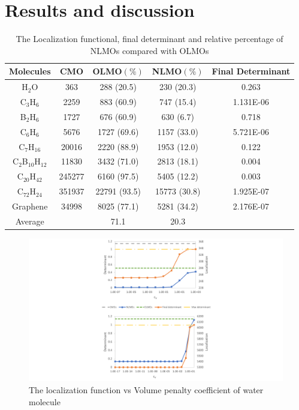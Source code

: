 \documentclass[aps,prl,reprint,amsmath,amssymb]{revtex4-1}
\begin{document}
\section{Results and discussion}
\begin{table}[ht]
\caption{The Localization functional, final determinant and relative percentage of NLMOs compared with OLMOs}
\centering
\begin{tabular}{c c c c c}
\hline\hline
Molecules & CMO &  OLMO$(\%)$ & NLMO$(\%)$ & Final Determinant \\
\hline
H$_2$O& 363 & 288 (20.5) & 230 (20.3) & 0.263 \\ 
C$_3$H$_6$ & 2259 & 883 (60.9) & 747 (15.4) & 1.131E-06 \\ 
B$_2$H$_6$ & 1727 & 676 (60.9) & 630 (6.7) & 0.718 \\ 
C$_6$H$_6$  & 5676 & 1727 (69.6) & 1157 (33.0) & 5.721E-06 \\ 
C$_7$H$_{16}$ & 20016 & 2220 (88.9) & 1953 (12.0) & 0.122 \\ 
C$_2$B$_{10}$H$_{12}$ & 11830 & 3432 (71.0) & 2813 (18.1) & 0.004 \\ 
C$_{20}$H$_{42}$ & 245277 & 6160 (97.5) & 5405 (12.2) & 0.003 \\ 
C$_{72}$H$_{24}$ & 351937 & 22791 (93.5) & 15773 (30.8) & 1.925E-07 \\ 
Graphene & 34998 & 8025 (77.1) & 5281 (34.2) & 2.176E-07\\
Average & & 71.1 & 20.3 & \\
\hline
\end{tabular}
\label{table:nonlin}
\end{table}

\begin{figure}[htbp]
\includegraphics[scale=0.65]{figure_1.pdf} 
  \caption{The localization function vs Volume penalty coefficient of water molecule}
\end{figure}
\end{document}
